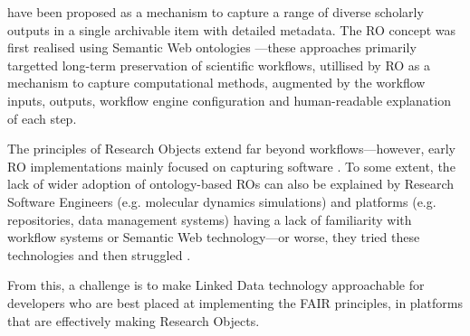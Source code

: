  \cite{Bechhofer 2013} have been proposed as a mechanism to capture a range of diverse scholarly outputs in a single archivable item with detailed metadata. The RO concept was first realised using Semantic Web ontologies \cite{myExperiment 2009,Belhajjame 2015}---these approaches primarily targetted long-term preservation of \glspl{scientific workflow}, utillised by RO as a mechanism to capture computational methods, augmented by the workflow inputs, outputs,  workflow engine configuration and human-readable explanation of each step.

The principles of Research Objects extend far beyond workflows---however, early RO implementations mainly focused on capturing software \cite{Goble 2018}. To some extent, the lack of wider adoption of ontology-based ROs can also be explained by Research Software Engineers (e.g. molecular dynamics simulations) and platforms (e.g. repositories, data management systems) having a lack of familiarity with workflow systems or Semantic Web technology---or worse, they tried these technologies and then struggled \cite{Carriero 2010,Tudorache 2020}.

From this, a challenge is to make Linked Data technology approachable for developers who are best placed at implementing the FAIR principles, in platforms that are effectively making Research Objects.

